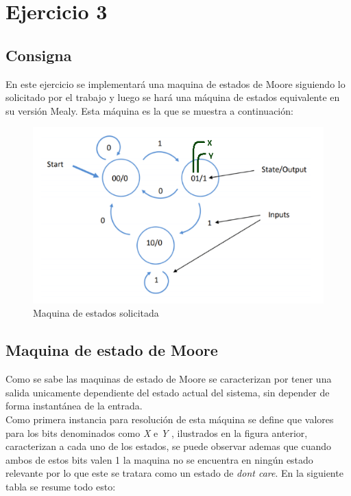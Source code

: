 \chapter{Ejercicio 3}


\section{Consigna}

En este ejercicio se implementará una maquina de estados de Moore siguiendo lo solicitado por el trabajo y luego se hará una máquina de estados equivalente en su versión Mealy. Esta máquina es la que se muestra a continuación:\\

\begin{figure}[H]
\begin{center}
\includegraphics[scale=0.8]{../Ejercicio-3/imagenes/consigna.png}
\end{center}
\caption{Maquina de estados solicitada}

\end{figure}


\section{Maquina de estado de Moore}

Como se sabe las maquinas de estado de Moore se caracterizan por tener una salida unicamente dependiente del estado actual del sistema, sin depender de forma instantánea de la entrada.\\

Como primera instancia para resolución de esta máquina se define que valores para los bits denominados como \emph{X} e \emph{Y }, ilustrados en la figura anterior, caracterizan a cada uno de los estados, se puede observar ademas que cuando ambos de estos bits valen 1 la maquina no se encuentra en ningún estado relevante por lo que este se tratara como un estado de \emph{don\textasciiacute t care}. En la siguiente tabla se resume todo esto:\\

